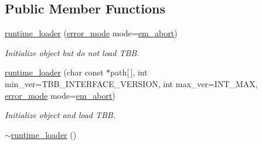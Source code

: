 \subsection*{Public Member Functions}
\begin{DoxyCompactItemize}
\item 
\hypertarget{classtbb_1_1interface6_1_1runtime__loader_a2f87eaf99564c705aa140f2eb8848eaa}{}\hyperlink{classtbb_1_1interface6_1_1runtime__loader_a2f87eaf99564c705aa140f2eb8848eaa}{runtime\+\_\+loader} (\hyperlink{classtbb_1_1interface6_1_1runtime__loader_ab85c82f9c0ccd91905f2795a79ac1295}{error\+\_\+mode} mode=\hyperlink{classtbb_1_1interface6_1_1runtime__loader_ab85c82f9c0ccd91905f2795a79ac1295ac41f8e03c7e8bfc6a420be035d59cc35}{em\+\_\+abort})\label{classtbb_1_1interface6_1_1runtime__loader_a2f87eaf99564c705aa140f2eb8848eaa}

\begin{DoxyCompactList}\small\item\em Initialize object but do not load T\+B\+B. \end{DoxyCompactList}\item 
\hyperlink{classtbb_1_1interface6_1_1runtime__loader_a3e0932074d2f3ad04605e7e5da88c561}{runtime\+\_\+loader} (char const $\ast$path\mbox{[}$\,$\mbox{]}, int min\+\_\+ver=T\+B\+B\+\_\+\+I\+N\+T\+E\+R\+F\+A\+C\+E\+\_\+\+V\+E\+R\+S\+I\+O\+N, int max\+\_\+ver=I\+N\+T\+\_\+\+M\+A\+X, \hyperlink{classtbb_1_1interface6_1_1runtime__loader_ab85c82f9c0ccd91905f2795a79ac1295}{error\+\_\+mode} mode=\hyperlink{classtbb_1_1interface6_1_1runtime__loader_ab85c82f9c0ccd91905f2795a79ac1295ac41f8e03c7e8bfc6a420be035d59cc35}{em\+\_\+abort})
\begin{DoxyCompactList}\small\item\em Initialize object and load T\+B\+B. \end{DoxyCompactList}\item 
\hypertarget{classtbb_1_1interface6_1_1runtime__loader_aa3b96f53e165e3d692c3c36292ba0737}{}\hyperlink{classtbb_1_1interface6_1_1runtime__loader_aa3b96f53e165e3d692c3c36292ba0737}{$\sim$runtime\+\_\+loader} ()\label{classtbb_1_1interface6_1_1runtime__loader_aa3b96f53e165e3d692c3c36292ba0737}


\end{DoxyCompactItemize}
